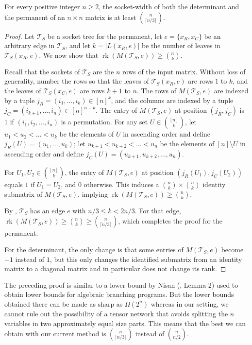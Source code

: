 \documentclass{toc}
\newcommand{\rk}{\ensuremath{\operatorname{rk}}}
\newcommand{\ts}{\ensuremath{\mathcal{T}_S}}
\begin{document}
\begin{lemma}
For every positive integer $n\geq 2$, the socket-width of both the determinant and the permanent of an $n\times n$ matrix is at least $\binom{n}{\lceil n/3 \rceil}$.
\end{lemma}
\begin{proof}
  Let $\ts$ be a socket tree for the permanent, let $e = \{x_R,
  x_C\}$ be an arbitrary edge in $\ts$, and let $k = |L(x_R, e)|$ 
be the number of
  leaves in $\ts(x_R, e)$.  We now show that $\rk(M(\ts, e)) \ge
  \binom{n}{k}$.

  Recall that the sockets of $\ts$ are the $n$ rows of the input
  matrix.  Without loss of generality, number the rows so that the
  leaves of $\ts(x_R, e)$ are rows $1$ to $k$, and the leaves of $\ts(x_C,
  e)$ are rows $k+1$ to $n$.  The rows of $M(\ts, e)$ are indexed by
  a tuple $j_R = (i_1, \ldots, i_k) \in [n]^k$, and the columns are indexed by a
  tuple $j_C = (i_{k+1}, \ldots, i_n) \in [n]^{n-k}$.  The entry of
  $M(\ts, e)$ at position $(j_R, j_C)$ is $1$ if $(i_1, i_2, \ldots,
  i_n)$ is a permutation.  For any set $U \in \binom{[n]}{k}$, let $u_1 <
  u_2 < \ldots < u_k$ be the elements of $U$ in ascending order and
  define $j_R(U) = (u_1, \ldots, u_k)$; let $u_{k+1} < u_{k+2} < \ldots < u_{n}$ be the elements of $[n]
  \setminus U$ in ascending order and define $j_C(U) = (u_{k+1}, u_{k+2}, \ldots,
  u_n)$.

  For $U_1, U_2 \in \binom{[n]}{k}$, the entry of $M(\ts, e)$ at position $(j_R(U_1),
  j_C(U_2))$ equals $1$ if $U_1 = U_2$, and $0$ otherwise. This
  induces a $\binom{n}{k} \times \binom{n}{k}$ identity submatrix
  of $M(\ts, e)$, implying $\rk(M(\ts, e)) \ge \binom{n}{k}$.

  By , $\ts$ has an edge $e$ with $n/3
  \le k < 2n/3$.  For that edge, $\rk(M(\ts, e)) \ge \binom{n}{k} \ge \binom{n}{\lceil n/3 \rceil}$, which completes the proof for the permanent.

  For the determinant, the only change is that some
  entries of $M(\ts, e)$ become $-1$ instead of $1$, but this only changes the
  identified submatrix from an identity matrix to a diagonal matrix and
  in particular does not change its rank.
\end{proof}

The preceding proof is similar to a lower bound by Nisan
(\cite{Nisan91}, Lemma 2) used to obtain lower bounds for algebraic
branching programs.  But the lower bounds obtained there can be made
as sharp as $\Omega(2^n)$ whereas in our setting, we cannot rule out
the possibility of a tensor network that avoids splitting the $n$
variables in two approximately equal size parts.  This means that the best we can
obtain with our current method is $\binom{n}{\lceil n/3 \rceil}$
instead of $\binom{n}{n/2}$.
\end{document}
